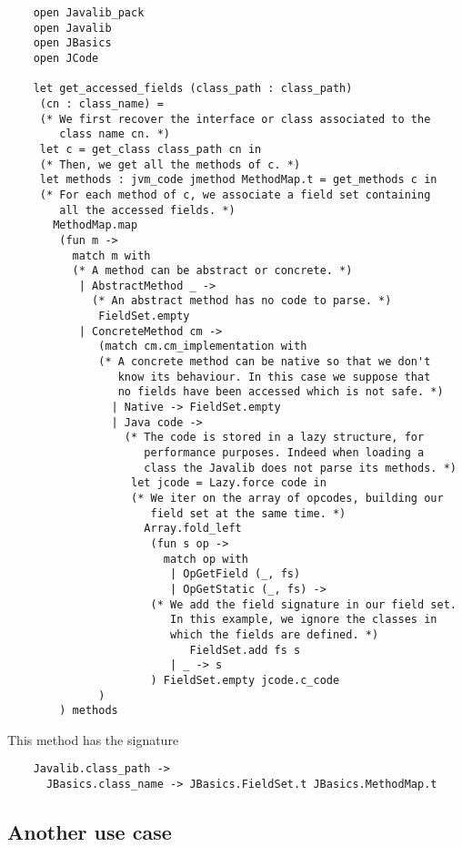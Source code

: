 \documentclass{article}
\begin{document}
\begin{verbatim}
    open Javalib_pack
    open Javalib
    open JBasics
    open JCode

    let get_accessed_fields (class_path : class_path)
     (cn : class_name) =
     (* We first recover the interface or class associated to the
        class name cn. *)
     let c = get_class class_path cn in
     (* Then, we get all the methods of c. *)
     let methods : jvm_code jmethod MethodMap.t = get_methods c in
     (* For each method of c, we associate a field set containing
        all the accessed fields. *)
       MethodMap.map
        (fun m ->
          match m with
          (* A method can be abstract or concrete. *)
           | AbstractMethod _ ->
             (* An abstract method has no code to parse. *)
              FieldSet.empty
           | ConcreteMethod cm ->
              (match cm.cm_implementation with
              (* A concrete method can be native so that we don't
                 know its behaviour. In this case we suppose that
                 no fields have been accessed which is not safe. *)
                | Native -> FieldSet.empty
                | Java code ->
                  (* The code is stored in a lazy structure, for
                     performance purposes. Indeed when loading a
                     class the Javalib does not parse its methods. *)
                   let jcode = Lazy.force code in
                   (* We iter on the array of opcodes, building our
                      field set at the same time. *)
                     Array.fold_left
                      (fun s op ->
                        match op with
                         | OpGetField (_, fs)
                         | OpGetStatic (_, fs) ->
                      (* We add the field signature in our field set.
                         In this example, we ignore the classes in
                         which the fields are defined. *)
                            FieldSet.add fs s
                         | _ -> s
                      ) FieldSet.empty jcode.c_code
              )
        ) methods
\end{verbatim}
This method has the signature

\begin{verbatim}
    Javalib.class_path ->
      JBasics.class_name -> JBasics.FieldSet.t JBasics.MethodMap.t
\end{verbatim}
\subsection{Another use case}
\end{document}
